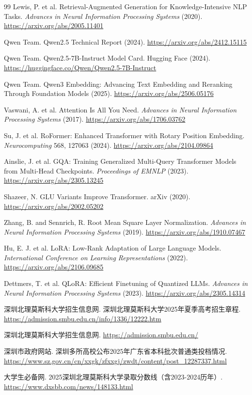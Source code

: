 \documentclass[UTF8,a4paper,11pt]{ctexart}
\begin{document}
\begin{thebibliography}{99}
Lewis, P. et al. Retrieval-Augmented Generation for Knowledge-Intensive NLP Tasks. \textit{Advances in Neural Information Processing Systems} (2020). \url{https://arxiv.org/abs/2005.11401}

Qwen Team. Qwen2.5 Technical Report (2024). \url{https://arxiv.org/abs/2412.15115}

Qwen Team. Qwen2.5-7B-Instruct Model Card. Hugging Face (2024). \url{https://huggingface.co/Qwen/Qwen2.5-7B-Instruct}

Qwen Team. Qwen3 Embedding: Advancing Text Embedding and Reranking Through Foundation Models (2025). \url{https://arxiv.org/abs/2506.05176}

Vaswani, A. et al. Attention Is All You Need. \textit{Advances in Neural Information Processing Systems} (2017). \url{https://arxiv.org/abs/1706.03762}

Su, J. et al. RoFormer: Enhanced Transformer with Rotary Position Embedding. \textit{Neurocomputing} 568, 127063 (2024). \url{https://arxiv.org/abs/2104.09864}

Ainslie, J. et al. GQA: Training Generalized Multi-Query Transformer Models from Multi-Head Checkpoints. \textit{Proceedings of EMNLP} (2023). \url{https://arxiv.org/abs/2305.13245}

Shazeer, N. GLU Variants Improve Transformer. arXiv (2020). \url{https://arxiv.org/abs/2002.05202}

Zhang, B. and Sennrich, R. Root Mean Square Layer Normalization. \textit{Advances in Neural Information Processing Systems} (2019). \url{https://arxiv.org/abs/1910.07467}

Hu, E. J. et al. LoRA: Low-Rank Adaptation of Large Language Models. \textit{International Conference on Learning Representations} (2022). \url{https://arxiv.org/abs/2106.09685}

Dettmers, T. et al. QLoRA: Efficient Finetuning of Quantized LLMs. \textit{Advances in Neural Information Processing Systems} (2023). \url{https://arxiv.org/abs/2305.14314}

深圳北理莫斯科大学招生信息网. 深圳北理莫斯科大学2025年夏季高考招生章程. \url{https://admission.smbu.edu.cn/info/1336/12222.htm}

深圳北理莫斯科大学招生信息网. \url{https://admission.smbu.edu.cn/}

深圳市政府网站. 深圳多所高校公布2025年广东省本科批次普通类投档情况. \url{https://www.sz.gov.cn/cn/xxgk/zfxxgj/zwdt/content/post_12287337.html}

大学生必备网. 2025深圳北理莫斯科大学录取分数线（含2023-2024历年）. \url{https://www.dxsbb.com/news/148133.html}
\end{thebibliography}
\end{document}

